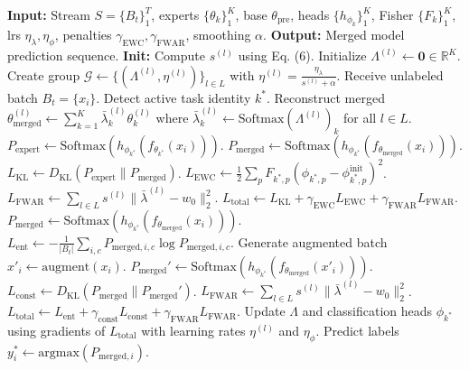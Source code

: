 \documentclass{article}
\begin{document}
\begin{algorithm}[tb]
\caption{FW-CMS with Anchor Regularization (FW-CMS+FWAR)}
\label{alg:fwar}
\begin{algorithmic}[1]
\footnotesize
\STATE \textbf{Input:} Stream $S = \{B_t\}_1^T$, experts $\{\theta_k\}_1^K$, base $\theta_{\text{pre}}$, heads $\{h_{\phi_k}\}_1^K$, Fisher $\{F_k\}_1^K$, lrs $\eta_{\lambda},\eta_{\phi}$, penalties $\gamma_{\text{EWC}},\gamma_{\text{FWAR}}$, smoothing $\alpha$.
\STATE \textbf{Output:} Merged model prediction sequence.
\STATE \textbf{Init:} Compute $s^{(l)}$ using Eq. (6). Initialize $\Lambda^{(l)} \leftarrow \mathbf{0} \in \mathbb{R}^K$. Create group $\mathcal{G} \leftarrow \{ (\Lambda^{(l)}, \eta^{(l)}) \}_{l \in L}$ with $\eta^{(l)} = \frac{\eta_{\lambda}}{s^{(l)} + \alpha}$.
\STATE Receive unlabeled batch $B_t = \{x_i\}$.
\STATE Detect active task identity $k^*$.
\STATE Reconstruct merged $\theta_{\text{merged}}^{(l)} \leftarrow \sum_{k=1}^K \bar{\lambda}_k^{(l)} \theta_k^{(l)}$ where $\bar{\lambda}_k^{(l)} \leftarrow \text{Softmax}(\Lambda^{(l)})_k$ for all $l \in L$.
\STATE $P_{\text{expert}} \leftarrow \text{Softmax}(h_{\phi_{k^*}}(f_{\theta_{k^*}}(x_i)))$.
\STATE $P_{\text{merged}} \leftarrow \text{Softmax}(h_{\phi_{k^*}}(f_{\theta_{\text{merged}}}(x_i)))$.
\STATE $L_{\text{KL}} \leftarrow D_{\text{KL}}(P_{\text{expert}} \parallel P_{\text{merged}})$.
\STATE $L_{\text{EWC}} \leftarrow \frac{1}{2} \sum_{p} F_{k^*,p} (\phi_{k^*,p} - \phi_{k^*,p}^{\text{init}})^2$.
\STATE $L_{\text{FWAR}} \leftarrow \sum_{l \in L} s^{(l)} \| \bar{\lambda}^{(l)} - w_0 \|_2^2$.
\STATE $L_{\text{total}} \leftarrow L_{\text{KL}} + \gamma_{\text{EWC}} L_{\text{EWC}} + \gamma_{\text{FWAR}} L_{\text{FWAR}}$.
\STATE $P_{\text{merged}} \leftarrow \text{Softmax}(h_{\phi_{k^*}}(f_{\theta_{\text{merged}}}(x_i)))$.
\STATE $L_{\text{ent}} \leftarrow -\frac{1}{|B_t|} \sum_{i,c} P_{\text{merged},i,c} \log P_{\text{merged},i,c}$.
\STATE Generate augmented batch $x'_i \leftarrow \text{augment}(x_i)$.
\STATE $P_{\text{merged}}' \leftarrow \text{Softmax}(h_{\phi_{k^*}}(f_{\theta_{\text{merged}}}(x'_i)))$.
\STATE $L_{\text{const}} \leftarrow D_{\text{KL}}(P_{\text{merged}} \parallel P_{\text{merged}}')$.
\STATE $L_{\text{FWAR}} \leftarrow \sum_{l \in L} s^{(l)} \| \bar{\lambda}^{(l)} - w_0 \|_2^2$.
\STATE $L_{\text{total}} \leftarrow L_{\text{ent}} + \gamma_{\text{const}} L_{\text{const}} + \gamma_{\text{FWAR}} L_{\text{FWAR}}$.
\ENDIF
\STATE Update $\Lambda$ and classification heads $\phi_{k^*}$ using gradients of $L_{\text{total}}$ with learning rates $\eta^{(l)}$ and $\eta_{\phi}$.
\STATE Predict labels $y_i^* \leftarrow \text{argmax}(P_{\text{merged},i})$.
\ENDFOR
\end{algorithmic}
\end{algorithm}
\end{document}
